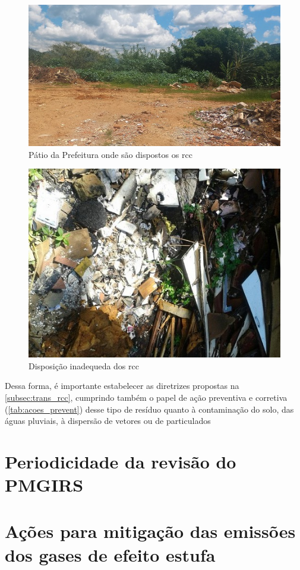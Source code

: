 \begin{figure}[h]
	\centering
	\includegraphics[width=0.7\linewidth]{produtos/prodquatro/patio_rcc}
	\caption{Pátio da Prefeitura onde são dispostos os \gls{rcc}}
	\label{fig:patio_rcc}
\end{figure}

\begin{figure}[h!]
	\centering
	\includegraphics[width=0.6\linewidth]{produtos/prodquatro/rcc}
	\caption{Disposição inadequeda dos \gls{rcc}}
	\label{fig:rcc}
\end{figure}

Dessa forma, é importante estabelecer as diretrizes propostas na \autoref{subsec:trans_rcc}, cumprindo também o papel de ação preventiva e corretiva (\autoref{tab:acoes_prevent}) desse tipo de resíduo quanto à contaminação do solo, das águas pluviais, à dispersão de vetores ou de particulados



\FloatBarrier
\newpage
\section{Periodicidade da revisão do PMGIRS}
\label{sec:revisao_pmgirs}

\FloatBarrier
\newpage
\section{Ações para mitigação das emissões dos gases de efeito estufa}
\label{sec:acoes_efeito_estufa}

